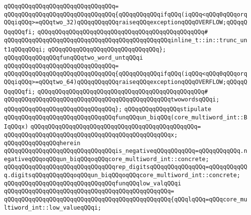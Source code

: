 \verb|qQQqqQQqqQQqqQQqqQQqqQQqqQQqqQQq=|\newline
\verb|qQQqqQQqqQQqqQQqqQQqqQQqqQQqqQQq{qQQqqQQqqQQqifqQQq(iqQQq<qQQq0qQQqorqQQqiqQQq>=qQQqtwo_32)qQQqqQQqqQQqraiseqQQqexceptionqQQqOVERFLOW;qQQqqQQqqQQqfi;|\newline
\verb|qQQqqQQqqQQqqQQqqQQqqQQqqQQqqQQqqQQqqQQqqQQqqQQq#|\newline
\verb|qQQqqQQqqQQqqQQqqQQqqQQqqQQqqQQqqQQqqQQqqQQqqQQqinline_t::in::trunc_unt1qQQqqQQqi;|\newline
\verb|qQQqqQQqqQQqqQQqqQQqqQQqqQQqqQQq};|\newline
\newline
\verb|qQQqqQQqqQQqqQQqfunqQQqtwo_word_untqQQqi|\newline
\verb|qQQqqQQqqQQqqQQqqQQqqQQqqQQqqQQq=|\newline
\verb|qQQqqQQqqQQqqQQqqQQqqQQqqQQqqQQq{qQQqqQQqqQQqifqQQq(iqQQq<qQQq0qQQqorqQQqiqQQq>=qQQqtwo_64)qQQqqQQqqQQqraiseqQQqexceptionqQQqOVERFLOW;qQQqqQQqqQQqfi;|\newline
\verb|qQQqqQQqqQQqqQQqqQQqqQQqqQQqqQQqqQQqqQQqqQQqqQQq#|\newline
\verb|qQQqqQQqqQQqqQQqqQQqqQQqqQQqqQQqqQQqqQQqqQQqqQQqtwowordsqQQqi;|\newline
\verb|qQQqqQQqqQQqqQQqqQQqqQQqqQQqqQQq};|\newline
\newline
\verb|qQQqqQQqqQQqqQQqstipulate|\newline
\verb|qQQqqQQqqQQqqQQqqQQqqQQqqQQqqQQqfunqQQqun_biqQQq(core_multiword_int::BIqQQqx)|\newline
\verb|qQQqqQQqqQQqqQQqqQQqqQQqqQQqqQQqqQQqqQQqqQQqqQQq=|\newline
\verb|qQQqqQQqqQQqqQQqqQQqqQQqqQQqqQQqqQQqqQQqqQQqqQQqx;|\newline
\verb|qQQqqQQqqQQqqQQqherein|\newline
\verb|qQQqqQQqqQQqqQQqqQQqqQQqqQQqqQQqis_negativeqQQqqQQqqQQq=qQQqqQQqqQQq.negativeqQQqoqQQqun_biqQQqoqQQqcore_multiword_int::concrete;|\newline
\verb|qQQqqQQqqQQqqQQqqQQqqQQqqQQqqQQqrep_digitsqQQqqQQqqQQqqQQq=qQQqqQQqqQQq.digitsqQQqqQQqqQQqoqQQqun_biqQQqoqQQqcore_multiword_int::concrete;|\newline
\newline
\verb|qQQqqQQqqQQqqQQqqQQqqQQqqQQqqQQqfunqQQqlow_valqQQqi|\newline
\verb|qQQqqQQqqQQqqQQqqQQqqQQqqQQqqQQqqQQqqQQqqQQqqQQq=|\newline
\verb|qQQqqQQqqQQqqQQqqQQqqQQqqQQqqQQqqQQqqQQqqQQqqQQq{qQQqlqQQq=qQQqcore_multiword_int::low_valueqQQqi;|\newline
